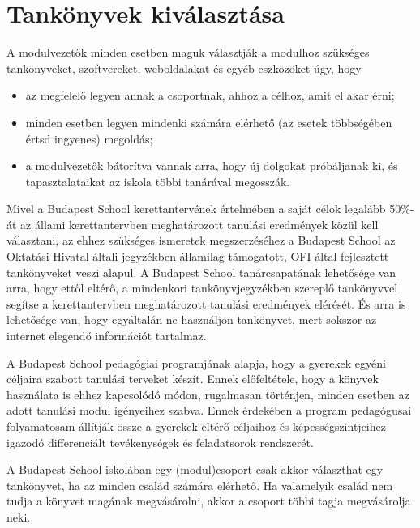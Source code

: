 \section{Tankönyvek kiválasztása}
\label{sec:tankonyvek}

A modulvezetők minden esetben maguk választják a modulhoz szükséges tankönyveket, szoftvereket, weboldalakat és egyéb eszközöket úgy, hogy

\begin{itemize}

      \item
            az megfelelő legyen annak a csoportnak, ahhoz a célhoz, amit el akar érni;
      \item
            minden esetben legyen mindenki számára elérhető (az esetek többségében értsd ingyenes) megoldás;
      \item
            a modulvezetők bátorítva vannak arra, hogy új dolgokat próbáljanak ki, és tapasztalataikat az iskola többi tanárával megosszák.
\end{itemize}

Mivel a Budapest School kerettantervének értelmében a saját célok legalább 50\%-át az állami kerettantervben meghatározott tanulási eredmények közül kell választani, az ehhez szükséges ismeretek megszerzéséhez a Budapest School az Oktatási Hivatal általi jegyzékben államilag támogatott, OFI által fejlesztett tankönyveket veszi alapul. A Budapest School tanárcsapatának lehetősége van arra, hogy ettől eltérő, a mindenkori tankönyvjegyzékben szereplő tankönyvvel segítse a kerettantervben meghatározott tanulási eredmények elérését. És arra is lehetősége van, hogy egyáltalán ne használjon tankönyvet, mert sokszor az internet elegendő információt tartalmaz.

A Budapest School pedagógiai programjának alapja, hogy a gyerekek egyéni céljaira szabott tanulási terveket készít. Ennek előfeltétele, hogy a könyvek használata is ehhez kapcsolódó módon, rugalmasan történjen, minden esetben az adott tanulási modul igényeihez szabva. Ennek érdekében a program pedagógusai folyamatosam állítják össze a gyerekek eltérő céljaihoz és képességszintjeihez igazodó differenciált tevékenységek és feladatsorok rendszerét.

A Budapest School iskolában egy (modul)csoport csak akkor választhat egy tankönyvet, ha az minden család számára elérhető. Ha valamelyik család nem tudja a könyvet magának megvásárolni, akkor a csoport többi tagja megvásárolja neki.
